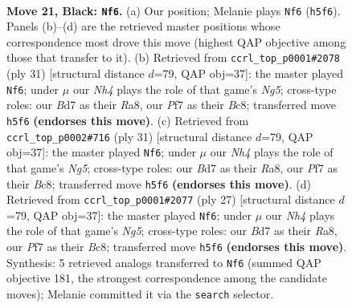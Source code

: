 \documentclass[11pt]{article}
\begin{document}
\clearpage

\begin{figure}[p]\centering
\begin{subfigure}{0.46\textwidth}\centering
\resizebox{\linewidth}{!}{%
\newchessgame
\chessboard[
  setfen={5rk1/3brppp/1n2p3/p1pq3n/6P1/1P1NP3/P3BRPP/RNQ3K1 b - - 0 21},
  showmover=false,
  pgfstyle=straightmove, color=movearrow, markmove={h5-f6}
]}
\caption{}
\end{subfigure}\hfill
\begin{subfigure}{0.46\textwidth}\centering
\resizebox{\linewidth}{!}{%
\newchessgame
\chessboard[
  setfen={r1b2rk1/3p1ppp/p1p1p3/4q3/4P1n1/2N2P2/PPP3PP/2KRQB1R b - - 0 16},
  showmover=false,
  pgfstyle=straightmove, color=movearrow, markmove={g4-f6}
]}
\caption{}
\end{subfigure}
\\[4pt]
\begin{subfigure}{0.46\textwidth}\centering
\resizebox{\linewidth}{!}{%
\newchessgame
\chessboard[
  setfen={r1b2rk1/3p1ppp/p1p1p3/4q3/4P1n1/2N2P2/PPP3PP/2KRQB1R b - - 0 16},
  showmover=false,
  pgfstyle=straightmove, color=movearrow, markmove={g4-f6}
]}
\caption{}
\end{subfigure}\hfill
\begin{subfigure}{0.46\textwidth}\centering
\resizebox{\linewidth}{!}{%
\newchessgame
\chessboard[
  setfen={r1b2rk1/3p1ppp/p1p1p3/4q3/4P1n1/2N2P2/PPP3PP/2KRQB1R b - - 0 14},
  showmover=false,
  pgfstyle=straightmove, color=movearrow, markmove={g4-f6}
]}
\caption{}
\end{subfigure}
\caption{\textbf{Move 21, Black: \texttt{Nf6}.} (a) Our position; Melanie plays \texttt{Nf6} (\texttt{h5f6}). Panels (b)--(d) are the retrieved master positions whose correspondence most drove this move (highest QAP objective among those that transfer to it). (b) Retrieved from \texttt{ccrl\_top\_p0001\#2078} (ply 31) [structural distance $d$=79, QAP obj=37]: the master played \texttt{Nf6}; under $\mu$ our \emph{Nh4} plays the role of that game's \emph{Ng5}; cross-type roles: our \emph{B}d7 as their \emph{R}a8, our \emph{P}f7 as their \emph{B}c8; transferred move \texttt{h5f6} \textbf{(endorses this move)}. (c) Retrieved from \texttt{ccrl\_top\_p0002\#716} (ply 31) [structural distance $d$=79, QAP obj=37]: the master played \texttt{Nf6}; under $\mu$ our \emph{Nh4} plays the role of that game's \emph{Ng5}; cross-type roles: our \emph{B}d7 as their \emph{R}a8, our \emph{P}f7 as their \emph{B}c8; transferred move \texttt{h5f6} \textbf{(endorses this move)}. (d) Retrieved from \texttt{ccrl\_top\_p0001\#2077} (ply 27) [structural distance $d$=79, QAP obj=37]: the master played \texttt{Nf6}; under $\mu$ our \emph{Nh4} plays the role of that game's \emph{Ng5}; cross-type roles: our \emph{B}d7 as their \emph{R}a8, our \emph{P}f7 as their \emph{B}c8; transferred move \texttt{h5f6} \textbf{(endorses this move)}. Synthesis: 5 retrieved analogs transferred to \texttt{Nf6} (summed QAP objective 181, the strongest correspondence among the candidate moves); Melanie committed it via the \texttt{search} selector.}
\label{fig:thought-m41}
\end{figure}
\end{document}
